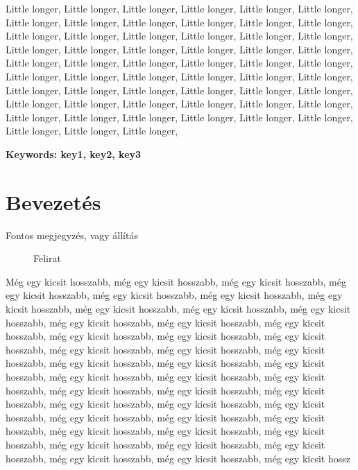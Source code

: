 \documentclass[a4paper,oneside,onecolumn,12pt]{LegrandOrangeBook}
\newcommand{\comment}[1]{{\textcolor{red}{#1}}}
\newcommand{\commentaron}[1]{{\textcolor{blue}{#1}}}
\begin{document}
Little longer, Little longer, Little longer, Little longer, Little longer, Little longer, Little longer, Little longer, Little longer, Little longer, Little longer, Little longer, Little longer, Little longer, Little longer, Little longer, Little longer, Little longer, Little longer, Little longer, Little longer, Little longer, Little longer, Little longer, Little longer, Little longer, Little longer, Little longer, Little longer, Little longer, Little longer, Little longer, Little longer, Little longer, Little longer, Little longer, Little longer, Little longer, Little longer, Little longer, Little longer, Little longer, Little longer, Little longer, Little longer, Little longer, Little longer, Little longer, Little longer, Little longer, Little longer, Little longer, Little longer, Little longer, Little longer, Little longer, Little longer, 

\textbf{Keywords: key1, key2, key3}

\pagebreak

\chapter*{Bevezetés}
\begin{eBox}
    Fontos megjegyzés, vagy állítás
\end{eBox}

\begin{figure}
  \begin{tBox}
  \end{tBox}
  \caption{Felirat}\label{fig:link}
\end{figure}  

Még egy kicsit hosszabb, még egy kicsit hosszabb, még egy kicsit hosszabb, még egy kicsit hosszabb, még egy kicsit hosszabb, még egy kicsit hosszabb, még egy kicsit hosszabb, még egy kicsit hosszabb, még egy kicsit hosszabb, még egy kicsit hosszabb, még egy kicsit hosszabb, még egy kicsit hosszabb, még egy kicsit hosszabb, még egy kicsit hosszabb, még egy kicsit hosszabb, még egy kicsit hosszabb, még egy kicsit hosszabb, még egy kicsit hosszabb, még egy kicsit hosszabb, még egy kicsit hosszabb, még egy kicsit hosszabb, még egy kicsit hosszabb, még egy kicsit hosszabb, még egy kicsit hosszabb, még egy kicsit hosszabb, még egy kicsit hosszabb, még egy kicsit hosszabb, még egy kicsit hosszabb, még egy kicsit hosszabb, még egy kicsit hosszabb, még egy kicsit hosszabb, még egy kicsit hosszabb, még egy kicsit hosszabb, még egy kicsit hosszabb, még egy kicsit hosszabb, még egy kicsit hosszabb, még egy kicsit hosszabb, még egy kicsit hosszabb, még egy kicsit hosszabb, még egy kicsit hosszabb, még egy kicsit hosszabb, még egy kicsit hosszabb, még egy kicsit hossz
\end{document}
